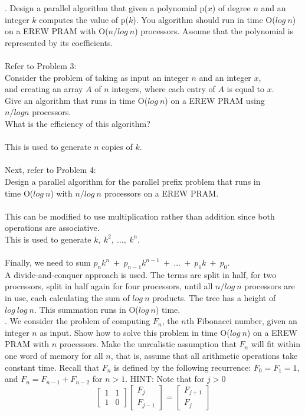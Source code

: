 \documentclass[10pt]{article}
\newcommand{\tab}{\hspace*{2em}}
\begin{document}
. Design a parallel algorithm that given a polynomial p($x$) of degree $n$ and an integer $k$ computes the value
of p($k$). You algorithm should run in time O($log~n$) on a EREW PRAM with O($n/log~n$) processors.
Assume that the polynomial is represented by its coefficients.\\
\\
Refer to Problem 3:\\
\tab Consider the problem of taking as input an integer $n$ and an integer $x$,\\
\tab and creating an array $A$ of $n$ integers, where each entry of $A$ is equal to $x$.\\
\tab Give an algorithm that runs in time O($log~n$) on a EREW PRAM using\\
\tab $n/log n$ processors.\\
\tab What is the efficiency of this algorithm?\\
\\
This is used to generate $n$ copies of $k$.\\
\\
Next, refer to Problem 4:\\
\tab Design a parallel algorithm for the parallel prefix problem that runs in\\
\tab time O($log~n$) with $n/log~n$ processors on a EREW PRAM.\\
\\
This can be modified to use multiplication rather than addition since both operations are associative.\\
This is used to generate $k,~k^2,~\ldots,~ k^n$.\\
\\
Finally, we need to sum $p_nk^n~+~p_{n-1}k^{n-1}~+~\ldots~+~p_1k~+~p_0$.\\
A divide-and-conquer approach is used. The terms are split in half, for two processors, split in half again for four processors, 
until all $n/log~n$ processors are in use, each calculating the sum of $log~n$ products. The tree has a height of $log~log~n$.
This summation runs in O($log~n$) time.\\

. We consider the problem of computing $F_n$, the $n$th Fibonacci number, given an integer $n$ as input.
Show how to solve this problem in time O($log~n$) on a EREW PRAM with $n$ processors. Make the
unrealistic assumption that $F_n$ will fit within one word of memory for all $n$, that is, assume that
all arithmetic operations take constant time. Recall that $F_n$ is defined by the following recurrence:
$F_{0} = F_{1} = 1$, and $F_{n} = F_{n-1} + F_{n-2}$ for $n > 1$.
HINT: Note that for $j > 0$
\[
\left[ \begin{array}{cc}
1 & 1\\
1 & 0
\end{array} \right]
\left[ \begin{array}{c}
F_j\\
F_{j-1}
\end{array} \right]
=
\left[ \begin{array}{c}
F_{j+1}\\
F_j
\end{array} \right]
\]
\end{document}
